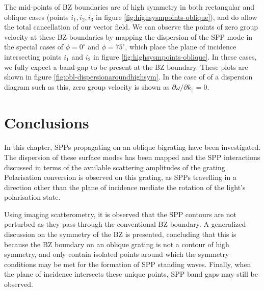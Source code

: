 The mid-points of BZ boundaries are of high symmetry in both rectangular and oblique cases (points $i_1,i_2, i_3$ in figure \ref{fig:highsysmpoints-oblique}), and do allow the total cancellation of our vector field. We can observe the points of zero group velocity at these BZ boundaries by mapping the dispersion of the SPP mode in the special cases of $\phi=0^\circ$ and $\phi=75^\circ$, which place the plane of incidence intersecting points $i_1$ and $i_2$ in figure \ref{fig:highsysmpoints-oblique}. In these cases, we fully expect a band-gap to be present at the BZ boundary. These plots are shown in figure \ref{fig:obl-dispersionaroundhighsym}. In the case of of a dispersion diagram such as this, zero group velocity is shown as $\partial \omega/\partial k_{\parallel} = 0$. 

\section{Conclusions}

In this chapter, SPPs propagating on an oblique bigrating have been investigated. The dispersion of these surface modes has been mapped and the SPP interactions discussed in terms of the available scattering amplitudes of the grating. Polarisation conversion is observed on this grating, as SPPs travelling in a direction other than the plane of incidence mediate the rotation of the light's polarisation state.

Using imaging scatterometry, it is observed that the SPP contours are not perturbed as they pass through the conventional BZ boundary. A generalized discussion on the symmetry of the BZ is presented, concluding that this is because the BZ boundary on an oblique grating is not a contour of high symmetry, and only contain isolated points around which the symmetry conditions may be met for the formation of SPP standing waves. Finally, when the plane of incidence intersects these unique points, SPP band gaps may still be observed.


%


